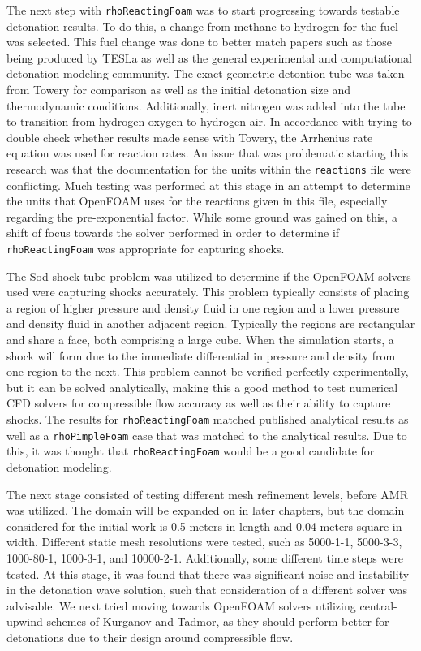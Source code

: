 The next step with \verb|rhoReactingFoam| was to start progressing towards testable detonation results. To do this, a change from methane to hydrogen for the fuel was selected. This fuel change was done to better match papers such as those being produced by TESLa as well as the general experimental and computational detonation modeling community. The exact geometric detontion tube was taken from Towery\cite{towery1} for comparison as well as the initial detonation size and thermodynamic conditions. Additionally, inert nitrogen was added into the tube to transition from hydrogen-oxygen to hydrogen-air. In accordance with trying to double check whether results made sense with Towery\cite{towery1}, the Arrhenius rate equation was used for reaction rates. An issue that was problematic starting this research was that the documentation for the units within the \verb|reactions| file were conflicting. Much testing was performed at this stage in an attempt to determine the units that OpenFOAM uses for the reactions given in this file, especially regarding the pre-exponential factor. While some ground was gained on this, a shift of focus towards the solver performed in order to determine if \verb|rhoReactingFoam| was appropriate for capturing shocks. 

The Sod shock tube problem was utilized to determine if the OpenFOAM solvers used were capturing shocks accurately. This problem typically consists of placing a region of higher pressure and density fluid in one region and a lower pressure and density fluid in another adjacent region. Typically the regions are rectangular and share a face, both comprising a large cube. When the simulation starts, a shock will form due to the immediate differential in pressure and density from one region to the next. This problem cannot be verified perfectly experimentally, but it can be solved analytically, making this a good method to test numerical CFD solvers for compressible flow accuracy as well as their ability to capture shocks. The results for \verb|rhoReactingFoam| matched published analytical results as well as a \verb|rhoPimpleFoam| case that was matched to the analytical results. Due to this, it was thought that \verb|rhoReactingFoam| would be a good candidate for detonation modeling. 

The next stage consisted of testing different mesh refinement levels, before AMR was utilized. The domain will be expanded on in later chapters, but the domain considered for the initial work is 0.5 meters in length and 0.04 meters square in width. Different static mesh resolutions were tested, such as 5000-1-1, 5000-3-3, 1000-80-1, 1000-3-1, and 10000-2-1. Additionally, some different time steps were tested. At this stage, it was found that there was significant noise and instability in the detonation wave solution, such that consideration of a different solver was advisable. We next tried moving towards OpenFOAM solvers utilizing central-upwind schemes of Kurganov and Tadmor, as they should perform better for detonations due to their design around compressible flow. 


